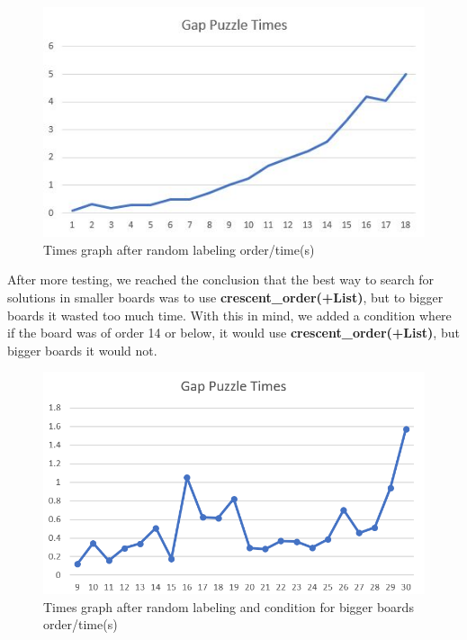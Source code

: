 \documentclass[runningheads]{llncs}
\begin{document}
\begin{figure}
    \begin{center}
        \includegraphics[scale=0.5]{images/graph2.png}
        \caption{Times graph after random labeling order/time(s)} \label{fig5}
    \end{center}
\end{figure}
After more testing, we reached the conclusion
that the best way to search for solutions in smaller boards was to use \textbf{crescent\_order(+List)}, but to bigger boards it wasted too much time. With this in mind,
we added a condition where if the board was of order 14 or below, it would use \textbf{crescent\_order(+List)}, but bigger boards it would not.
\begin{figure}
    \begin{center}
        \includegraphics[scale=0.3]{images/graph3.png}
        \caption{Times graph after random labeling and condition for bigger boards \newline order/time(s)} \label{fig5}
    \end{center}
\end{figure}
\end{document}
